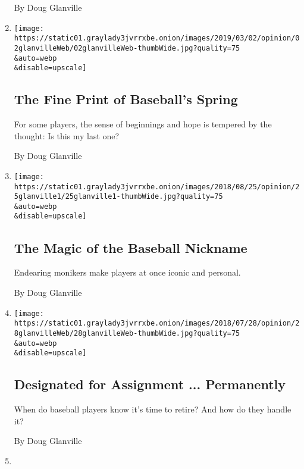 \begin{enumerate}
  By Doug Glanville
\item
  \href{/2019/03/01/opinion/glanville-baseball-spring-training.html}{}

  \texttt{[image: https://static01.graylady3jvrrxbe.onion/images/2019/03/02/opinion/02glanvilleWeb/02glanvilleWeb-thumbWide.jpg?quality=75\\\&auto=webp\\\&disable=upscale]}

  \hypertarget{the-fine-print-of-baseballs-spring}{%
  \subsection{The Fine Print of Baseball's
  Spring}\label{the-fine-print-of-baseballs-spring}}

  For some players, the sense of beginnings and hope is tempered by the
  thought: Is this my last one?

  By Doug Glanville
\item
  \href{/2018/08/25/opinion/baseball-nicknames.html}{}

  \texttt{[image: https://static01.graylady3jvrrxbe.onion/images/2018/08/25/opinion/25glanville1/25glanville1-thumbWide.jpg?quality=75\\\&auto=webp\\\&disable=upscale]}

  \hypertarget{the-magic-of-the-baseball-nickname}{%
  \subsection{The Magic of the Baseball
  Nickname}\label{the-magic-of-the-baseball-nickname}}

  Endearing monikers make players at once iconic and personal.

  By Doug Glanville
\item
  \href{/2018/07/27/opinion/baseball-retirement-chase-utley-mlb-dodgers-phillies.html}{}

  \texttt{[image: https://static01.graylady3jvrrxbe.onion/images/2018/07/28/opinion/28glanvilleWeb/28glanvilleWeb-thumbWide.jpg?quality=75\\\&auto=webp\\\&disable=upscale]}

  \hypertarget{designated-for-assignment--permanently}{%
  \subsection{Designated for Assignment ...
  Permanently}\label{designated-for-assignment--permanently}}

  When do baseball players know it's time to retire? And how do they
  handle it?

  By Doug Glanville
\item
  \href{/2018/04/06/opinion/baseballs-unwritten-rules.html}{}


\end{enumerate}
